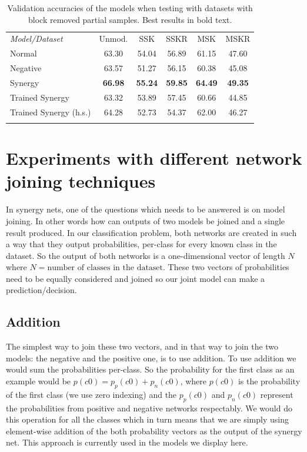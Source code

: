 \documentclass[b5paper]{book}
\begin{document}
\begin{table}
\centering
\caption{Validation accuracies of the models when testing with datasets with block removed partial samples. Best results in bold text.}
\label{tab:9}
\tabcolsep=0.06cm
\begin{tabular}{lccccc}
\hline\noalign{\smallskip}
\emph{Model/Dataset} & Unmod. & SSK & SSKR & MSK & MSKR \\
\noalign{\smallskip}\hline\noalign{\smallskip}
Normal & 63.30 & 54.04 & 56.89 & 61.15 & 47.60 \\
Negative & 63.57 & 51.27 & 56.15 & 60.38 & 45.08 \\
Synergy & \textbf{66.98} & \textbf{55.24} & \textbf{59.85} & \textbf{64.49} & \textbf{49.35}\\
Trained Synergy & 63.32 & 53.89 & 57.45 & 60.66 & 44.85\\
Trained Synergy (h.s.) & 64.28 & 52.73 & 54.37 & 62.00 & 46.27 \\
\noalign{\smallskip}\hline
\end{tabular}
\end{table}

\section{Experiments with different network joining techniques}

In synergy nets, one of the questions which needs to be answered is on model joining. In other words how can outputs of two models be joined and a single result produced. In our classification problem, both networks are created in such a way that they output probabilities, per-class for every known class in the dataset. So the output of both networks is a one-dimensional vector of length \( N \) where \( N = \text{number of classes in the dataset} \). These two vectors of probabilities need to be equally considered and joined so our joint model can make a prediction/decision.

\subsection{Addition}

The simplest way to join these two vectors, and in that way to join the two models: the negative and the positive one, is to use addition. To use addition we would sum the probabilities per-class. So the probability for the first class as an example would be \( p(c0) = p_p(c0) + p_n(c0) \), where \( p(c0) \) is the probability of the first class (we use zero indexing) and the \(p_p(c0)\) and \(p_n(c0)\) represent the probabilities from positive and negative networks respectably. We would do this operation for all the classes which in turn means that we are simply using element-wise addition of the both probability vectors as the output of the synergy net. This approach is currently used in the models we display here.
\end{document}
